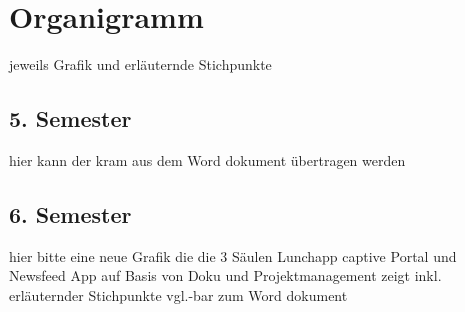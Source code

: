 \section{Organigramm}

jeweils Grafik und erläuternde Stichpunkte

\subsection{5. Semester}

hier kann der kram aus dem Word dokument übertragen werden

\subsection{6. Semester}

hier bitte eine neue Grafik die die 3 Säulen Lunchapp captive Portal und Newsfeed App auf Basis von Doku und Projektmanagement zeigt inkl. erläuternder Stichpunkte vgl.-bar zum Word dokument